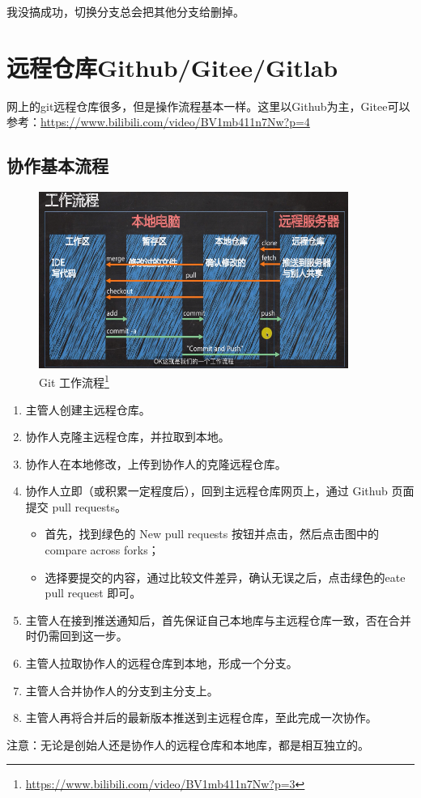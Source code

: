 {\color{red} 我没搞成功，切换分支总会把其他分支给删掉。}




\section{远程仓库Github/Gitee/Gitlab}
网上的git远程仓库很多，但是操作流程基本一样。这里以Github为主，Gitee可以参考：\url{https://www.bilibili.com/video/BV1mb411n7Nw?p=4}


\subsection{协作基本流程}
\begin{figure}[h!]
\centering
\includegraphics[width=0.9\textwidth]{pictures/git.png}
\caption{Git 工作流程\footnote{\url{https://www.bilibili.com/video/BV1mb411n7Nw?p=3}}}
\end{figure}

\begin{enumerate}
\item  主管人创建主远程仓库。
\item 协作人克隆主远程仓库，并拉取到本地。
\item 协作人在本地修改，上传到协作人的克隆远程仓库。
\item 协作人立即（或积累一定程度后），回到主远程仓库网页上，通过 Github 页面提交 pull requests。
\begin{itemize}
\item 首先，找到绿色的 New pull requests 按钮并点击，然后点击图中的 compare across forks；
\item 选择要提交的内容，通过比较文件差异，确认无误之后，点击绿色的eate pull request 即可。
\end{itemize}
\item 主管人在接到推送通知后，首先保证自己本地库与主远程仓库一致，否在合并时仍需回到这一步。
\item 主管人拉取协作人的远程仓库到本地，形成一个分支。
\item 主管人合并协作人的分支到主分支上。
\item 主管人再将合并后的最新版本推送到主远程仓库，至此完成一次协作。
\end{enumerate}
注意：无论是创始人还是协作人的远程仓库和本地库，都是相互独立的。


